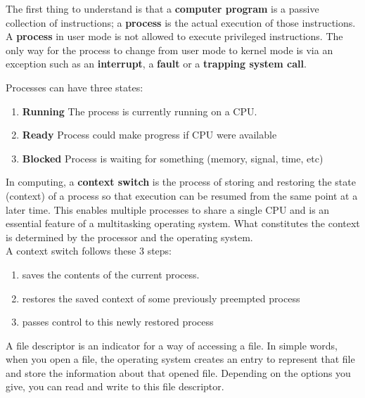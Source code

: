 



The first thing to understand is that a {\bf computer program} is a passive collection of instructions; a {\bf process} is the actual execution of those instructions.\\

A {\bf process} in user mode is not allowed to execute privileged instructions.  The only way for the process to change from user mode to kernel mode is via an exception such as an {\bf interrupt}, a {\bf fault} or a {\bf trapping system call}.


Processes can have three states:
\begin{enumerate}
\item  {\bf Running}  The process is currently running on a CPU.
\item {\bf Ready} Process could make progress if CPU were available
\item  {\bf Blocked} Process is waiting for something (memory, signal, time, etc)
\end{enumerate}




In computing, a {\bf context switch} is the process of storing and restoring the state (context) of a process so that execution can be resumed from the same point at a later time. This enables multiple processes to share a single CPU and is an essential feature of a multitasking operating system. What constitutes the context is determined by the processor and the operating system.\\

A context switch follows these 3 steps:

\begin{enumerate}
\item  saves the contents of the current process.
\item  restores the saved context of some previously preempted process
\item  passes control to this newly restored process
\end{enumerate}



A file descriptor is an indicator for a way of accessing a file.  In simple words, when you open a file, the operating system creates an entry to represent that file and store the information about that opened file.  Depending on the options you give, you can read and write to this file descriptor.


